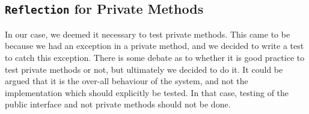 
%
%
%

\subsection{\texttt{Reflection} for Private Methods}\label{sec:privTest}
In our case, we deemed it necessary to test private methods. This came to be because we had an exception in a private method, and we decided to write a test to catch this exception. There is some debate as to whether it is good practice to test private methods or not, but ultimately we decided to do it. It could be argued that it is the over-all behaviour of the system, and not the implementation which should explicitly be tested. In that case, testing of the public interface and not private methods should not be done.
% 